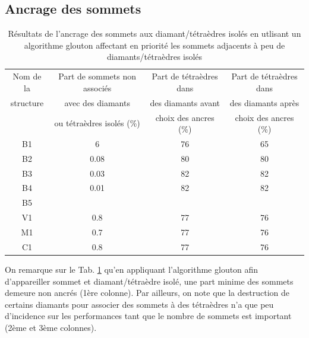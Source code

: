 \subsection{Ancrage des sommets}
\begin{table}[H]
\footnotesize
\centering
\begin{tabular}{|c | c | c | c |}
\hline
Nom de la & Part de sommets non associés & Part de tétraèdres dans  & Part de tétraèdres dans \\
structure&avec des diamants  & des diamants avant & des diamants après \\
& ou tétraèdres isolés (\%) & choix des ancres (\%)& choix des ancres (\%)\\
\hline
B1 & 6 & 76& 65 \\
B2 & 0.08& 80 & 80 \\
B3 & 0.03& 82 & 82\\
B4 & 0.01 & 82 & 82\\
B5 &  &  & \\
V1 & 0.8  & 77 & 76 \\
M1 & 0.7 & 77& 76\\
C1 & 0.8 & 77 & 76 \\
\hline  
\end{tabular}
\caption{Résultats de l'ancrage des sommets aux diamant/tétraèdres isolés en utlisant un algorithme glouton affectant en priorité les sommets adjacents à peu de diamants/tétraèdres isolés}
\label{tab:results_ancres}
\end{table}
\noindent
On remarque sur le Tab. \ref{tab:results_ancres} qu'en appliquant l'algorithme glouton afin d'appareiller sommet et diamant/tétraèdre isolé, une part minime des sommets demeure non ancrés (1ère colonne). Par ailleurs, on note que la destruction de certains diamants pour associer des sommets à des tétraèdres n'a que peu d'incidence sur les performances tant que le nombre de sommets est important (2ème et 3ème colonnes).

